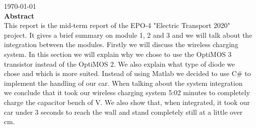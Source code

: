 \documentclass[12pt]{scrreprt}
\begin{document}
\begin{titlepage}


{\large \today}\\ [1.5cm]


 
% 

\textbf{Abstract} \\ 
This report is the mid-term report of the EPO-4 "Electric Transport 2020" project. 
It gives a brief summary on module 1, 2 and 3 and we will talk about the integration between the modules.
Firstly we will discuss the wireless charging system. 
In this section we will explain why we chose to use the OptiMOS 3 transistor instead of the OptiMOS 2. 
We also explain what type of diode we chose and which is more suited. 
Instead of using Matlab we decided to use C\# to implement the handling of our car. 
When talking about the system integration we conclude that it took our wireless charging system 5:02 minutes to completely charge the capacitor bench of \unit[20]{V}. 
We also show that, when integrated, it took our car under 3 seconds to reach the wall and stand completely still at a little over \unit[10]{cm}.





\vfill %

\end{titlepage}
\end{document}

